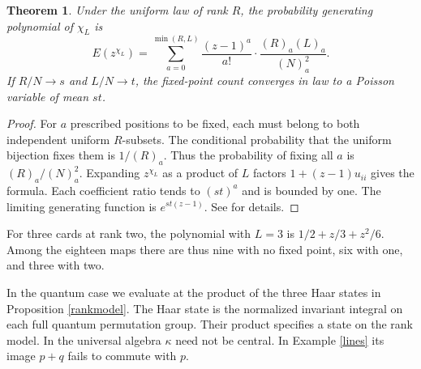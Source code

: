 \documentclass[11pt,a4paper]{article}
\newtheorem{thm}{Theorem}[section]
\begin{document}
\begin{thm}\label{classicallaw}
Under the uniform law of rank $R$, the probability generating polynomial of $\chi_L$ is
\[
 E(z^{\chi_L})=\sum_{a=0}^{\min(R,L)}\frac{(z-1)^a}{a!}\cdot\frac{(R)_a(L)_a}{(N)_a^2}.
\]
If $R/N\to s$ and $L/N\to t$, the fixed-point count converges in law to a Poisson variable of mean $st$.
\end{thm}
\begin{proof}
For $a$ prescribed positions to be fixed, each must belong to both independent uniform $R$-subsets. The conditional probability that the uniform bijection fixes them is $1/(R)_a$. Thus the probability of fixing all $a$ is $(R)_a/(N)_a^2$. Expanding $z^{\chi_L}$ as a product of $L$ factors $1+(z-1)u_{ii}$ gives the formula. Each coefficient ratio tends to $(st)^a$ and is bounded by one. The limiting generating function is $e^{st(z-1)}$. See \cite{qp} for details.
\end{proof}

For three cards at rank two, the polynomial with $L=3$ is $1/2+z/3+z^2/6$. Among the eighteen maps there are thus nine with no fixed point, six with one, and three with two.

In the quantum case we evaluate at the product of the three Haar states in Proposition \ref{rankmodel}. The Haar state is the normalized invariant integral on each full quantum permutation group. Their product specifies a state on the rank model. In the universal algebra $\kappa$ need not be central. In Example \ref{lines} its image $p+q$ fails to commute with $p$.
\end{document}
